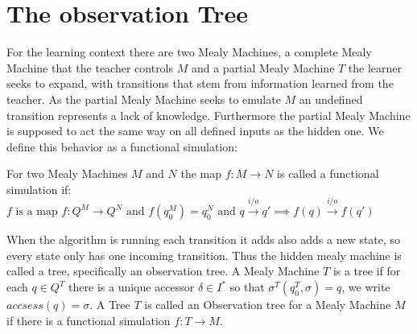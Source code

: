 \section{The observation Tree}
For the learning context there are two Mealy Machines, a complete Mealy Machine that the teacher controls $M$ and a partial Mealy Machine $T$ the learner seeks to expand, with transitions that stem from information learned from the teacher. As the partial Mealy Machine seeks to emulate $M$ an undefined transition represents a lack of knowledge. Furthermore the partial Mealy Machine is supposed to act the same way on all defined inputs as the hidden one. We define this behavior as a functional simulation:
\begin{definition}\label{def:funcsim}
 For two Mealy Machines $M$ and $N$ the map $f:M\rightarrow N$ is called a functional simulation if: $f\text{ is a map }f:Q^M\rightarrow Q^N \text{ and }
	f(q_0^M)=q_0^N \text{ and } q\xrightarrow{i/o}q' \implies f(q)\xrightarrow{i/o}f(q') 
 $
\end{definition} 
When the algorithm is running each transition it adds also adds a new state, so every state only has one incoming transition. Thus the hidden mealy machine is called a tree, specifically an observation tree.
A Mealy Machine $T$ is a tree if for each $q\in Q^T$ there is a unique accessor $\delta\in I^*$ so that $\sigma^T(q_0^T,\sigma)=q$, we write $accsess(q)=\sigma$. A Tree $T$ is called an Observation tree for a Mealy Machine $M$ if there is a functional simulation $f:T\rightarrow M$.



